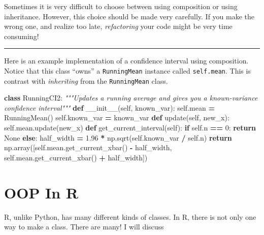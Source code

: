 \documentclass[
  12pt,
  krantz2]{krantz}
\makeatletter
\newenvironment{Shaded}{\begin{snugshade}}{\end{snugshade}}
\newcommand{\CommentTok}[1]{\textcolor[rgb]{0.37,0.37,0.37}{\textit{#1}}}
\newcommand{\ControlFlowTok}[1]{\textcolor[rgb]{0.27,0.27,0.27}{\textbf{#1}}}
\newcommand{\DecValTok}[1]{\textcolor[rgb]{0.06,0.06,0.06}{#1}}
\newcommand{\FloatTok}[1]{\textcolor[rgb]{0.06,0.06,0.06}{#1}}
\newcommand{\FunctionTok}[1]{\textcolor[rgb]{0,0,0}{#1}}
\newcommand{\KeywordTok}[1]{\textcolor[rgb]{0.27,0.27,0.27}{\textbf{#1}}}
\newcommand{\NormalTok}[1]{#1}
\newcommand{\OperatorTok}[1]{\textcolor[rgb]{0.43,0.43,0.43}{\textbf{#1}}}
\newcommand{\VariableTok}[1]{\textcolor[rgb]{0,0,0}{#1}}
\newenvironment{kframe}{%
\medskip{}
\setlength{\fboxsep}{.8em}
 \def\at@end@of@kframe{}%
 \ifinner\ifhmode%
  \def\at@end@of@kframe{\end{minipage}}%
  \begin{minipage}{\columnwidth}%
 \fi\fi%
 \def\FrameCommand##1{\hskip\@totalleftmargin \hskip-\fboxsep
 \colorbox{shadecolor}{##1}\hskip-\fboxsep
     \hskip-\linewidth \hskip-\@totalleftmargin \hskip\columnwidth}%
 \MakeFramed {\advance\hsize-\width
   \@totalleftmargin\z@ \linewidth\hsize
   \@setminipage}}%
 {\par\unskip\endMakeFramed%
 \at@end@of@kframe}
\renewenvironment{Shaded}{\begin{kframe}}{\end{kframe}}
\makeatother
\begin{document}
Sometimes it is very difficult to choose between using composition or using inheritance. However, this choice should be made very carefully. If you make the wrong one, and realize too late, \emph{refactoring} your code might be very time consuming!

\begin{center}\rule{0.5\linewidth}{0.5pt}\end{center}

Here is an example implementation of a confidence interval using composition. Notice that this class ``owns'' a \texttt{RunningMean} instance called \texttt{self.mean}. This is contrast with \emph{inheriting} from the \texttt{RunningMean} class.

\begin{Shaded}
\begin{Highlighting}[]
\KeywordTok{class}\NormalTok{ RunningCI2:}
  \CommentTok{"""Updates a running average and gives you a known{-}variance confidence interval"""}
  \KeywordTok{def} \FunctionTok{\_\_init\_\_}\NormalTok{(}\VariableTok{self}\NormalTok{, known\_var):}
    \VariableTok{self}\NormalTok{.mean }\OperatorTok{=}\NormalTok{ RunningMean()}
    \VariableTok{self}\NormalTok{.known\_var }\OperatorTok{=}\NormalTok{ known\_var}
  \KeywordTok{def}\NormalTok{ update(}\VariableTok{self}\NormalTok{, new\_x):    }
    \VariableTok{self}\NormalTok{.mean.update(new\_x)}
  \KeywordTok{def}\NormalTok{ get\_current\_interval(}\VariableTok{self}\NormalTok{):}
    \ControlFlowTok{if} \VariableTok{self}\NormalTok{.n }\OperatorTok{==} \DecValTok{0}\NormalTok{:}
      \ControlFlowTok{return} \VariableTok{None}
    \ControlFlowTok{else}\NormalTok{:}
\NormalTok{      half\_width }\OperatorTok{=} \FloatTok{1.96} \OperatorTok{*}\NormalTok{ np.sqrt(}\VariableTok{self}\NormalTok{.known\_var }\OperatorTok{/} \VariableTok{self}\NormalTok{.n)  }
      \ControlFlowTok{return}\NormalTok{ np.array([}\VariableTok{self}\NormalTok{.mean.get\_current\_xbar() }\OperatorTok{{-}}\NormalTok{ half\_width, }\VariableTok{self}\NormalTok{.mean.get\_current\_xbar() }\OperatorTok{+}\NormalTok{ half\_width])}
\end{Highlighting}
\end{Shaded}

\hypertarget{oop-in-r}{%
\section{OOP In R}\label{oop-in-r}}

R, unlike Python, has many different kinds of classes. In R, there is not only one way to make a class. There are many! I will discuss
\end{document}
